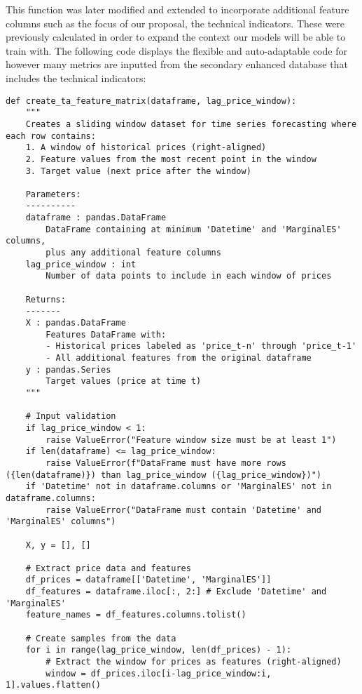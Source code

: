 \documentclass[12pt]{report} %
\begin{document}
This function was later modified and extended to incorporate additional feature columns such as the focus of our proposal, the technical indicators. These were previously calculated in order to expand the context our models will be able to train with. The following code displays the flexible and auto-adaptable code for however many metrics are inputted from the secondary enhanced database that includes the technical indicators:
\begin{lstlisting}
def create_ta_feature_matrix(dataframe, lag_price_window):
    """
    Creates a sliding window dataset for time series forecasting where each row contains:
    1. A window of historical prices (right-aligned)
    2. Feature values from the most recent point in the window
    3. Target value (next price after the window)
    
    Parameters:
    ----------
    dataframe : pandas.DataFrame
        DataFrame containing at minimum 'Datetime' and 'MarginalES' columns, 
        plus any additional feature columns
    lag_price_window : int
        Number of data points to include in each window of prices
        
    Returns:
    -------
    X : pandas.DataFrame
        Features DataFrame with:
        - Historical prices labeled as 'price_t-n' through 'price_t-1'
        - All additional features from the original dataframe
    y : pandas.Series
        Target values (price at time t)
    """
    
    # Input validation
    if lag_price_window < 1:
        raise ValueError("Feature window size must be at least 1")
    if len(dataframe) <= lag_price_window:
        raise ValueError(f"DataFrame must have more rows ({len(dataframe)}) than lag_price_window ({lag_price_window})")
    if 'Datetime' not in dataframe.columns or 'MarginalES' not in dataframe.columns:
        raise ValueError("DataFrame must contain 'Datetime' and 'MarginalES' columns")

    X, y = [], []
    
    # Extract price data and features
    df_prices = dataframe[['Datetime', 'MarginalES']]
    df_features = dataframe.iloc[:, 2:] # Exclude 'Datetime' and 'MarginalES'
    feature_names = df_features.columns.tolist()

    # Create samples from the data
    for i in range(lag_price_window, len(df_prices) - 1):
        # Extract the window for prices as features (right-aligned)
        window = df_prices.iloc[i-lag_price_window:i, 1].values.flatten()
        

\end{lstlisting}
\end{document}

